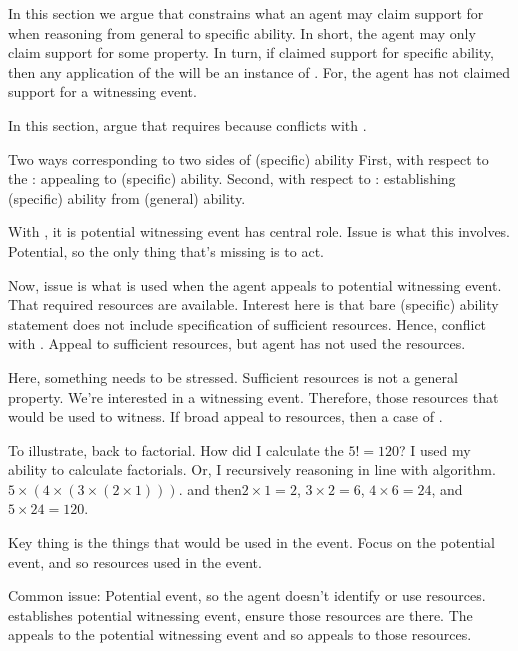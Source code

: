 \begin{note}[Summary]
  In this section we argue that \ESU{} constrains what an agent may claim support for when reasoning from general to specific ability.
  In short, the agent may only claim support for some property.
  In turn, if claimed support for specific ability, then any application of the \aben{} will be an instance of \AR{}.
  For, the agent has not claimed support for a witnessing event.



  In this section, argue that \ESU{} requires \AR{} because \ESU{} conflicts with \WR{}.

  Two ways corresponding to two sides of (specific) ability
  First, with respect to the \aben{}: appealing to (specific) ability.
  Second, with respect to \gsi{}: establishing (specific) ability from (general) ability.

  With \WR{}, it is potential witnessing event has central role.
  Issue is what this involves.
  Potential, so the only thing that's missing is to act.

  
  
  

  Now, issue is what is used when the agent appeals to potential witnessing event.
  That required resources are available.
  Interest here is that bare (specific) ability statement does not include specification of sufficient resources.
  Hence, conflict with \ESU{}.
  Appeal to sufficient resources, but agent has not used the resources.

  Here, something needs to be stressed.
  Sufficient resources is not a general property.
  We're interested in a witnessing event.
  Therefore, those resources that would be used to witness.
  If broad appeal to resources, then a case of \AR{}.

  To illustrate, back to factorial.
  How did I calculate the \(5! = 120\)?
  I used my ability to calculate factorials.
  Or, I recursively reasoning in line with algorithm.
  \(5 \times (4 \times (3 \times (2 \times 1)))\).
  and then\(2 \times 1 = 2\), \(3 \times 2 = 6\), \(4 \times 6 = 24\), and \(5 \times 24 = 120\).

  Key thing is the things that would be used in the event.
  Focus on the potential event, and so resources used in the event.

  Common issue: Potential event, so the agent doesn't identify or use resources.
  \gsi{} establishes potential witnessing event, ensure those resources are there.
  The \aben{} appeals to the potential witnessing event and so appeals to those resources.
\end{note}

